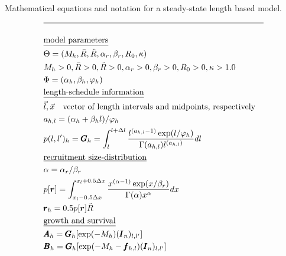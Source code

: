 \documentclass[12pt,letterpaper]{article}
\newcounter{saveEq}
\def\putEq{\setcounter{saveEq}{\value{equation}}}
\def\tableEq{ %
    \putEq \setcounter{equation}{0}
    \renewcommand{\theequation}{T\arabic{table}.\arabic{equation}}
    \vspace{-5mm}
    }
\begin{document}
\begin{table}
  \centering
\caption{Mathematical equations and notation for a steady-state length based model.}
\label{tab:equilibrium_model}
\tableEq
  \begin{align}
    \hline \nonumber \\
    &\mbox{\underline{model parameters}} \nonumber\\
    &\Theta = (M_h,\bar{R},\ddot{R},\alpha_r,\beta_r,R_0,\kappa) \label{T1.1}\\
    &M_h > 0 , \bar{R} > 0, \ddot{R}>0, \alpha_r > 0, \beta_r > 0, R_0>0,\kappa > 1.0 \label{T1.2}\\
    &\Phi = (\alpha_h,\beta_h,\varphi_h) \label{T1.3}\\
    &\mbox{\underline{length-schedule information}} \nonumber \\
    &\vec{l},\vec{x} \quad \mbox{vector of length intervals and midpoints, respectively} \nonumber\\
    &a_{h,l} = (\alpha_h + \beta_h l)/\varphi_h \label{T1.4} \\
    &p({l},{l'})_h =\pmb{G}_h= \int_{l}^{l+\Delta l}
        \frac{ l^{(a_{h,l}-1)} \exp(l/\varphi_h) }
        { \Gamma(a_{h,l}) l^{(a_{h,l})} } dl \label{T1.5} \\
    &\mbox{\underline{recruitment size-distribution}} \nonumber \\
    & \alpha = \alpha_r / \beta_r  \\
    &p[\bm{r}] = \int_{x_l-0.5\Delta x}^{x_l+0.5\Delta x}
      \frac{x^{(\alpha-1)}\exp(x / \beta_r)}{\Gamma(\alpha)x^\alpha}dx
        \label{T1.7}\\
    &\pmb{r}_h = 0.5 p[\bm{r}] \ddot{R} \label{T1.8}\\
    &\mbox{\underline{growth and survival}} \nonumber \\
    &\pmb{A}_h = \pmb{G}_h [\exp(-M_h) (\pmb{I}_n)_{l,l'}]\label{T1.10}\\
    &\pmb{B}_h = \pmb{G}_h [\exp(-M_h - \pmb{f}_{h,l}) (\pmb{I}_n)_{l,l'}] \label{T1.12}\\

\end{align}
\end{table}
\end{document}
